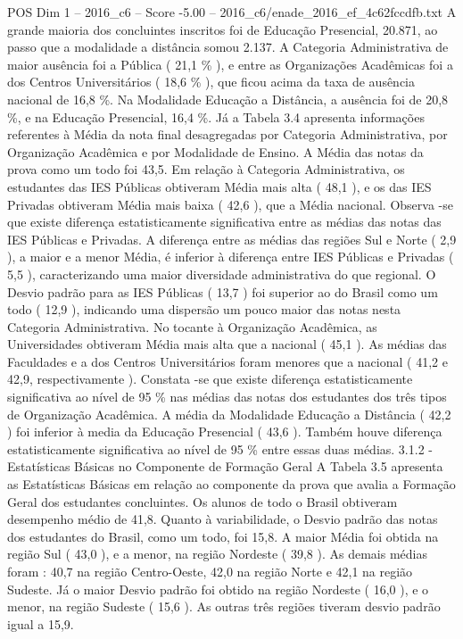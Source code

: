 \begin{textsample}{POS Dim 1 – 2016\_c6 – Score -5.00 – 2016\_c6/enade\_2016\_ef\_4c62fccdfb.txt}
A grande maioria dos concluintes inscritos foi de Educação Presencial, 20.871, ao passo que a modalidade a distância somou 2.137.
A Categoria Administrativa de maior ausência foi a Pública ( 21,1 \% ), e entre as Organizações Acadêmicas foi a dos Centros Universitários ( 18,6 \% ), que ficou acima da taxa de ausência nacional de 16,8 \%.
Na Modalidade Educação a Distância, a ausência foi de 20,8 \%, e na Educação Presencial, 16,4 \%.
Já a Tabela 3.4 apresenta informações referentes à Média da nota final desagregadas por Categoria Administrativa, por Organização Acadêmica e por Modalidade de Ensino.
A Média das notas da prova como um todo foi 43,5.
Em relação à Categoria Administrativa, os estudantes das IES Públicas obtiveram Média mais alta ( 48,1 ), e os das IES Privadas obtiveram Média mais baixa ( 42,6 ), que a Média nacional.
Observa -se que existe diferença estatisticamente significativa entre as médias das notas das IES Públicas e Privadas.
A diferença entre as médias das regiões Sul e Norte ( 2,9 ), a maior e a menor Média, é inferior à diferença entre IES Públicas e Privadas ( 5,5 ), caracterizando uma maior diversidade administrativa do que regional.
O Desvio padrão para as IES Públicas ( 13,7 ) foi superior ao do Brasil como um todo ( 12,9 ), indicando uma dispersão um pouco maior das notas nesta Categoria Administrativa.
No tocante à Organização Acadêmica, as Universidades obtiveram Média mais alta que a nacional ( 45,1 ).
As médias das Faculdades e a dos Centros Universitários foram menores que a nacional ( 41,2 e 42,9, respectivamente ).
Constata -se que existe diferença estatisticamente significativa ao nível de 95 \% nas médias das notas dos estudantes dos três tipos de Organização Acadêmica.
A média da Modalidade Educação a Distância ( 42,2 ) foi inferior à media da Educação Presencial ( 43,6 ).
Também houve diferença estatisticamente significativa ao nível de 95 \% entre essas duas médias. 3.1.2 - Estatísticas Básicas no Componente de Formação Geral A Tabela 3.5 apresenta as Estatísticas Básicas em relação ao componente da prova que avalia a Formação Geral dos estudantes concluintes.
Os alunos de todo o Brasil obtiveram desempenho médio de 41,8.
Quanto à variabilidade, o Desvio padrão das notas dos estudantes do Brasil, como um todo, foi 15,8.
A maior Média foi obtida na região Sul ( 43,0 ), e a menor, na região Nordeste ( 39,8 ).
As demais médias foram : 40,7 na região Centro-Oeste, 42,0 na região Norte e 42,1 na região Sudeste.
Já o maior Desvio padrão foi obtido na região Nordeste ( 16,0 ), e o menor, na região Sudeste ( 15,6 ).
As outras três regiões tiveram desvio padrão igual a 15,9.

\end{textsample}

